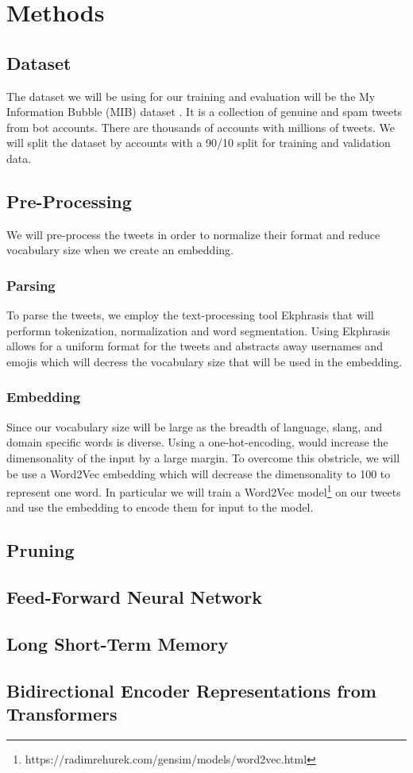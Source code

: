 \section{Methods}
\label{sec:methods}

\subsection{Dataset} The dataset we will be using for our training and
evaluation will be the My Information Bubble (MIB) dataset
\citep{Cresci:2017:PSS:3041021.3055135}. It is a collection of genuine
and spam tweets from bot accounts. There are thousands of accounts
with millions of tweets. We will split the dataset by accounts with a
90/10 split for training and validation data.

\subsection{Pre-Processing} We will pre-process the tweets in order to
normalize their format and reduce vocabulary size when we create an
embedding.

\subsubsection{Parsing} To parse the tweets, we employ the
text-processing tool Ekphrasis
\citep{baziotis-pelekis-doulkeridis:2017:SemEval2} that will performn
tokenization, normalization and word segmentation. Using Ekphrasis
allows for a uniform format for the tweets and abstracts away
usernames and emojis which will decress the vocabulary size that will
be used in the embedding.

\subsubsection{Embedding} Since our vocabulary size will be large as
the breadth of language, slang, and domain specific words is diverse.
Using a one-hot-encoding, would increase the dimensonality of the
input by a large margin. To overcome this obstricle, we will be use a
Word2Vec embedding \citep{Mikolov:2013:DRW:2999792.2999959} which will
decrease the dimensonality to 100 to represent one word. In particular
we will train a Word2Vec
model\footnote{https://radimrehurek.com/gensim/models/word2vec.html}
on our tweets and use the embedding to encode them for input to the
model.

\subsection{Pruning}

\subsection{Feed-Forward Neural Network}

\subsection{Long Short-Term Memory}

\subsection{Bidirectional Encoder Representations from Transformers}
